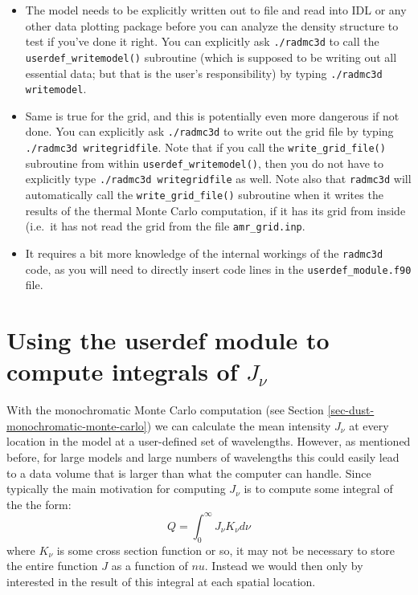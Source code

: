 \documentclass{report}
\begin{document}
\begin{itemize}
\item The model needs to be explicitly written out to file and read into IDL
  or any other data plotting package before you can analyze the density
  structure to test if you've done it right. You can explicitly ask
  {\small\tt ./radmc3d} to call the {\small\tt userdef\_writemodel()}
  subroutine (which is supposed to be writing out all essential data; but
  that is the user's responsibility) by typing {\small\tt ./radmc3d
    writemodel}.
\item Same is true for the grid, and this is potentially even more
  dangerous if not done. You can explicitly ask {\small\tt ./radmc3d} to
  write out the grid file by typing {\small\tt ./radmc3d writegridfile}.
  Note that if you call the {\small\tt write\_grid\_file()} subroutine
  from within {\small\tt userdef\_writemodel()}, then you do not have
  to explicitly type {\small\tt ./radmc3d writegridfile} as well.
  Note also that {\small\tt radmc3d} will automatically call the
  {\small\tt write\_grid\_file()} subroutine when it writes the
  results of the thermal Monte Carlo computation, if it has its
  grid from inside (i.e.\ it has not read the grid from the file
  {\small\tt amr\_grid.inp}.
\item It requires a bit more knowledge of the internal workings of the
  {\small\tt radmc3d} code, as you will need to directly insert code
  lines in the {\small\tt userdef\_module.f90} file. 
\end{itemize}


\section{Using the userdef module to compute integrals of $J_\nu$}
\label{sec-compute-radiation-integrals}
%
With the monochromatic Monte Carlo computation (see Section
\ref{sec-dust-monochromatic-monte-carlo}) we can calculate the mean
intensity $J_\nu$ at every location in the model at a user-defined set of
wavelengths. However, as mentioned before, for large models and large
numbers of wavelengths this could easily lead to a data volume that is
larger than what the computer can handle. Since typically the main
motivation for computing $J_\nu$ is to compute some integral of the
the form:
\begin{equation}
Q = \int_0^{\infty} J_\nu K_\nu d\nu
\end{equation}
where $K_\nu$ is some cross section function or so, it may not be
necessary to store the entire function $J$ as a function of $nu$.
Instead we would then only by interested in the result of this integral
at each spatial location. 
\end{document}
